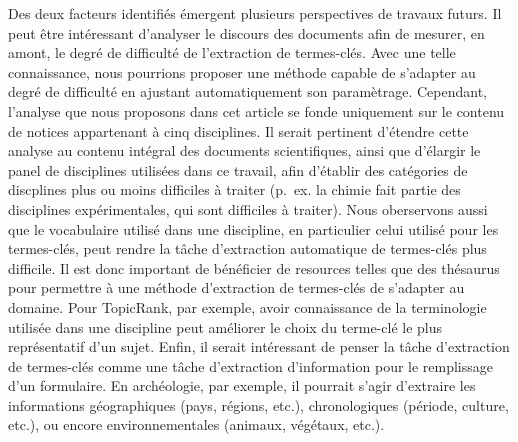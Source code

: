   Des deux facteurs identifiés émergent plusieurs perspectives de travaux
  futurs. Il peut être intéressant d'analyser le discours des documents afin de
  mesurer, en amont, le degré de difficulté de l'extraction de termes-clés. Avec
  une telle connaissance, nous pourrions proposer une méthode capable de
  s'adapter au degré de difficulté en ajustant automatiquement son paramètrage.
  Cependant, l'analyse que nous proposons dans cet article se fonde uniquement
  sur le contenu de notices appartenant à cinq disciplines. Il serait pertinent
  d'étendre cette analyse au contenu intégral des documents scientifiques, ainsi
  que d'élargir le panel de disciplines utilisées dans ce travail, afin
  d'établir des catégories de discplines plus ou moins difficiles à traiter
  (p.~ex. la chimie fait partie des disciplines expérimentales, qui sont
  difficiles à traiter). Nous oberservons aussi que le vocabulaire utilisé dans
  une discipline, en particulier celui utilisé pour les termes-clés, peut rendre
  la tâche d'extraction automatique de termes-clés plus difficile. Il est donc
  important de bénéficier de resources telles que des thésaurus pour permettre à
  une méthode d'extraction de termes-clés de s'adapter au domaine. Pour
  TopicRank, par exemple, avoir connaissance de la terminologie utilisée dans
  une discipline peut améliorer le choix du terme-clé le plus représentatif d'un
  sujet. Enfin, il serait intéressant de penser la tâche d'extraction de
  termes-clés comme une tâche d'extraction d'information pour le remplissage
  d'un formulaire. En archéologie, par exemple, il pourrait s'agir d'extraire
  les informations géographiques (pays, régions, etc.), chronologiques (période,
  culture, etc.), ou encore environnementales (animaux, végétaux, etc.).

